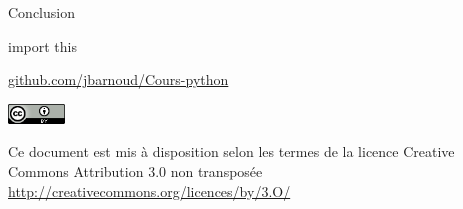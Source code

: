 \documentclass[xcolor=pdftex,dvipsnames,table,handout]{beamer}
\begin{document}
\begin{frame}{Conclusion}
\begin{center}
    \Huge{import this}
\end{center}
\end{frame}

\begin{frame}[plain]
\vfill
\begin{center}
{\Large%
\url{github.com/jbarnoud/Cours-python}%
}
\vfill
\vfill
\vfill
{\tiny%
\includegraphics[width=1.5cm]{img/logo/cc_by}

Ce document est mis à disposition selon les termes de la licence Creative Commons Attribution 3.0 non transposée\newline
\url{http://creativecommons.org/licences/by/3.O/}
}
\end{center}
\end{frame}
\end{document}
